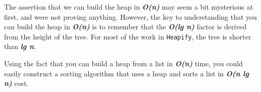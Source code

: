 
The assertion that we can build the heap in \textbf{\emph{O(n)}} may seem a bit mysterious at first, and were not proving anything. However, the key to understanding that you can build the heap in \textbf{\emph{O(n)}} is to remember that the \textbf{\emph{O(lg n)}} factor is derived from the height of the tree. For most of the work in \texttt{Heapify}, the tree is shorter than \textbf{\emph{lg n}}.

Using the fact that you can build a heap from a list in \textbf{\emph{O(n)}} time, you could easily construct a sorting algorithm that uses a heap and sorts a list in \textbf{\emph{O(n lg n)}} cost.